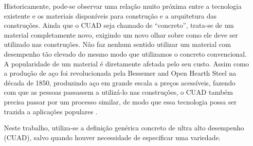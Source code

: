 
Historicamente, pode-se observar uma relação muito próxima entre a tecnologia existente e os materiais disponíveis para construção e a arquitetura das construções. Ainda que o CUAD seja chamado de “concreto”, trata-se de um material completamente novo, exigindo um novo olhar sobre como ele deve ser utilizado nas construções. Não faz nenhum sentido utilizar um material com desempenho tão elevado do mesmo modo que utilizamos o concreto convencional. A popularidade de um material é diretamente afetada pelo seu custo. Assim como a produção de aço foi revolucionada pela Bessemer and Open Hearth Steel na década de 1850, produzindo aço em grande escala a preços acessíveis, fazendo com que as pessoas passassem a utilizá-lo nas construções, o CUAD também precisa passar por um processo similar, de modo que essa tecnologia possa ser trazida a aplicações populares \cite[p.~9]{Tang}.

Neste trabalho, utiliza-se a definição genérica concreto de ultra alto desempenho (CUAD), salvo quando houver necessidade de especificar uma variedade.

